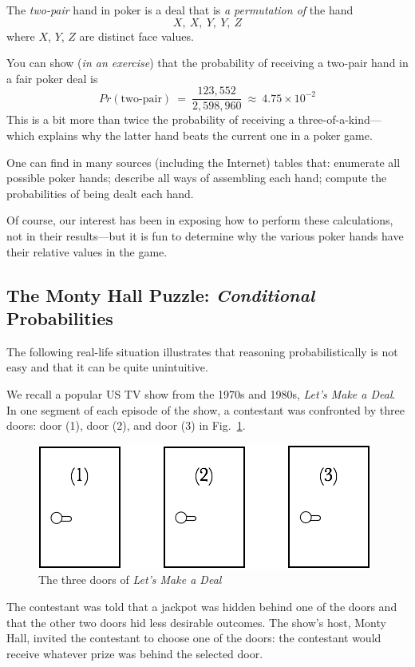 \begin{itemize}
\smallskip

The {\it two-pair} hand in poker is a deal that is {\em a permutation of} the hand
\[ X, \ X, \ Y, \ Y, \ Z \]
where $X$, $Y$, $Z$ are distinct face values.

\smallskip

You can show ({\em in an exercise}) that the probability of receiving a two-pair hand in a fair poker deal is
\[ Pr(\mbox{two-pair}) \ = \ \frac{123,552}{2, 598, 960} \ \approx \ 4.75  \times 10^{-2} \]
This is a bit more than twice the probability of receiving a three-of-a-kind---which explains why the latter hand beats the current one in a poker game.
\end{itemize}

\medskip

One can find in many sources (including the Internet) tables that: enumerate all possible poker hands; describe all ways of assembling each hand; compute the probabilities of being dealt each hand.

\smallskip

Of course, our interest has been in exposing how to perform these calculations, not in their
results---but it is fun to determine why the various poker hands have their relative values in the game.


\subsection{The Monty Hall Puzzle: {\em Conditional} Probabilities}
\label{sec:monty-hall}

The following real-life situation illustrates that reasoning probabilistically is not easy and that it can be quite unintuitive.

\bigskip


We recall a popular US TV show from the 1970s and 1980s, \textit{Let's Make a Deal}.  In one segment of each episode of the show, a contestant was confronted by three doors: door (1), door (2), and door (3) in Fig.~\ref{fig:MonthyHal-1}.
\begin{figure}[htb]
\begin{center}
        \includegraphics[scale=0.4]{FiguresMaths/MonthyHallInitial}
        \caption{The three doors of \textit{Let's Make a Deal}}
        \label{fig:MonthyHal-1}
\end{center}
\end{figure}
The contestant was told that a jackpot was hidden behind one of the doors and that the other two doors hid less desirable outcomes.  The show's host, Monty Hall, invited the contestant to choose one of the doors: the contestant would receive whatever prize was behind the selected door.

